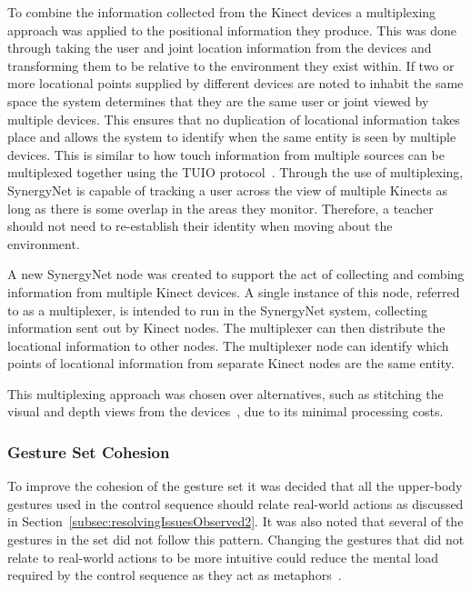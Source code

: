\documentclass[link]{IWCOMP}
\begin{document}
To combine the information collected from the Kinect devices a multiplexing approach was applied to the positional information they produce.
This was done through taking the user and joint location information from the devices and transforming them to be relative to the environment they exist within.
If two or more locational points supplied by different devices are noted to inhabit the same space the system determines that they are the same user or joint viewed by multiple devices.
This ensures that no duplication of locational information takes place and allows the system to identify when the same entity is seen by multiple devices.
This is similar to how touch information from multiple sources can be multiplexed together using the TUIO protocol~\cite{Kaltenbrunner2009}.
Through the use of multiplexing, SynergyNet is capable of tracking a user across the view of multiple Kinects as long as there is some overlap in the areas they monitor.
Therefore, a teacher should not need to re-establish their identity when moving about the environment.

A new SynergyNet node was created to support the act of collecting and combing information from multiple Kinect devices.
A single instance of this node, referred to as a multiplexer, is intended to run in the SynergyNet system, collecting information sent out by Kinect nodes.
The multiplexer can then distribute the locational information to other nodes.
The multiplexer node can identify which points of locational information from separate Kinect nodes are the same entity.

This multiplexing approach was chosen over alternatives, such as stitching the visual and depth views from the devices~\cite{Dubois2011}, due to its minimal processing costs.

\subsubsection{Gesture Set Cohesion} 
\label{subsubsec:studyImplementationGestureSet}

To improve the cohesion of the gesture set it was decided that all the upper-body gestures used in the control sequence should relate real-world actions as discussed in Section~\ref{subsec:resolvingIssuesObserved2}.
It was also noted that several of the gestures in the set did not follow this pattern.
Changing the gestures that did not relate to real-world actions to be more intuitive could reduce the mental load required by the control sequence as they act as metaphors~\cite{Wang2008}.
\end{document}
